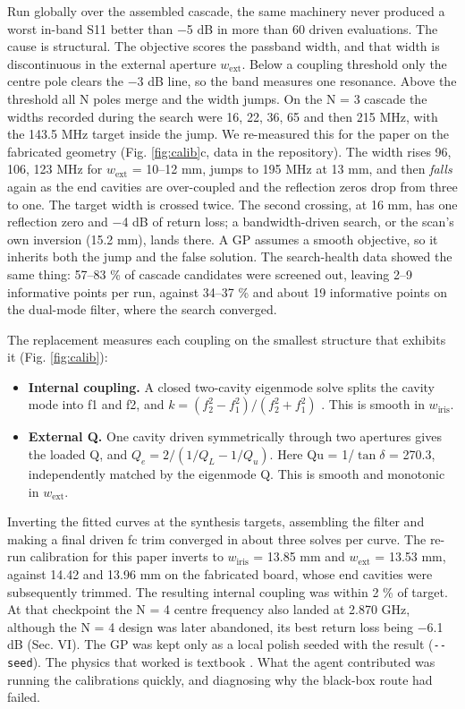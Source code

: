 \documentclass{ieeeaccess}
\begin{document}
Run globally over the assembled cascade, the same machinery never produced a
worst in-band S11 better than \ensuremath{-}5 dB in more than 60 driven evaluations. The
cause is structural. The objective scores the passband width, and that width
is discontinuous in the external aperture \(w_{\text{ext}}\). Below a coupling threshold
only the centre pole clears the \ensuremath{-}3 dB line, so the band measures one
resonance. Above the threshold all N poles merge and the width jumps. On the
N = 3 cascade the widths recorded during the search were 16, 22, 36, 65 and
then 215 MHz, with the 143.5 MHz target inside the jump. We re-measured this
for the paper on the fabricated geometry (Fig. \ref{fig:calib}c, data in the
repository). The width rises 96, 106, 123 MHz for \(w_{\text{ext}}\) = 10--12 mm,
jumps to 195 MHz at 13 mm, and then \emph{falls} again as the end cavities are
over-coupled and the reflection zeros drop from three to one. The target
width is crossed twice. The second crossing, at 16 mm, has one reflection
zero and \ensuremath{-}4 dB of return loss; a bandwidth-driven search, or the scan's own
inversion (15.2 mm), lands there. A GP assumes a smooth objective, so it
inherits both the jump and the false solution. The search-health data showed
the same thing:
57--83 \% of cascade candidates were screened out, leaving 2--9 informative
points per run, against 34--37 \% and about 19 informative points on the
dual-mode filter, where the search converged.

The replacement measures each coupling on the smallest structure that exhibits
it (Fig. \ref{fig:calib}):

\begin{itemize}
\item
  \textbf{Internal coupling.} A closed two-cavity eigenmode solve splits the
  cavity mode into f1 and f2, and \(k = (f_2^2 - f_1^2)/(f_2^2 + f_1^2)\)
  \cite{hong2001microstrip}. This is smooth in \(w_{\text{iris}}\).
\item
  \textbf{External Q.} One cavity driven symmetrically through two apertures gives
  the loaded Q, and \(Q_e = 2/(1/Q_L - 1/Q_u)\). Here Qu = 1/\(\tan\delta\) = 270.3,
  independently matched by the eigenmode Q. This is smooth and monotonic in
  \(w_{\text{ext}}\).
\end{itemize}

Inverting the fitted curves at the synthesis targets, assembling the filter
and making a final driven fc trim converged in about three solves per curve.
The re-run calibration for this paper inverts to \(w_{\text{iris}}\) = 13.85 mm
and \(w_{\text{ext}}\) = 13.53 mm, against 14.42 and 13.96 mm on the fabricated
board, whose end cavities were subsequently trimmed.
The resulting internal coupling was within 2 \% of target. At that checkpoint
the N = 4 centre frequency also landed at 2.870 GHz, although the N = 4 design
was later abandoned, its best return loss being \ensuremath{-}6.1 dB (Sec. VI). The GP was kept only as a local polish
seeded with the result (\texttt{-\/-seed}). The physics that worked is textbook
\cite{hong2001microstrip, cameron2018microwave}. What the agent contributed was
running the calibrations quickly, and diagnosing why the black-box route had
failed.
\end{document}
